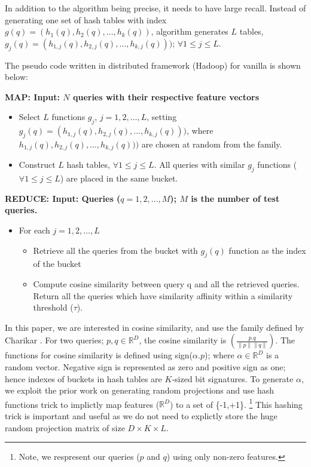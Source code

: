 In addition to the \lsh algorithm being precise, it needs to have large recall. 
Instead of generating one set of hash tables with index $g(q)=(h_1(q),h_2(q),\dots,h_k(q))$, 
\lsh algorithm generates $L$ tables, $g_j(q)=(h_{1,j}(q),h_{2,j}(q),\dots,h_{k,j}(q)))$; $\forall 1 \leq j \leq  L$. 


The pseudo code written in distributed framework (Hadoop) for vanilla \lsh is shown below: 


{\bf MAP: Input: $N$ queries with their respective feature vectors} \\
\begin{itemize}
\item Select $L$ functions $g_j$, $j=1,2,\dots,L$, setting  $g_j(q)=(h_{1,j}(q),h_{2,j}(q),\dots,h_{k,j}(q)))$, where $h_{1,j}(q),h_{2,j}(q),\dots,h_{k,j}(q)))$ are chosen at random from the \lsh family.
\item Construct $L$ hash tables, $\forall 1 \leq j \leq  L$. All queries with similar $g_j$ functions ($\forall 1 \leq j \leq  L$) are placed in the same bucket.    
\end{itemize}


{\bf REDUCE: Input: Queries ($q=1,2,\dots,M$); $M$ is the number of test queries.} \\
\begin{itemize}
\item For each $j=1,2,\dots,L$
\begin{itemize}
\item Retrieve all the queries from the bucket with $g_j(q)$ function as the index of the bucket 
\item Compute cosine similarity between query q and all the retrieved queries. Return all the queries which have similarity affinity within a similarity threshold ($\tau$). 
\end{itemize}
\end{itemize}

In this paper, we are interested in cosine similarity, and use the \lsh family defined by Charikar . 
For two queries; $p,q \in \mathbb{R}^D$, the cosine similarity is $\left( \frac{p.q}{ \| p \| \| q \| }\right)$. 
The \lsh functions for cosine similarity is defined using sign($\alpha.p$); where $\alpha \in \mathbb{R}^D$ is a random vector. 
Negative sign is represented as zero and positive sign as one; hence indexes of buckets in hash tables are $K$-sized bit signatures.  
To generate $\alpha$, we exploit the prior work on 
generating random projections \cite{Achlioptas03,LiH06} and 
use hash functions trick to implictly map features ($\mathbb{R}^D$) to a set of \{-1,+1\}.
\footnote{Note, we respresent our queries ($p$ and $q$) using only non-zero features.}  
This hashing trick is important and useful as we do not need to explictly store the 
huge random projection matrix of size $D \times K \times L$.  


